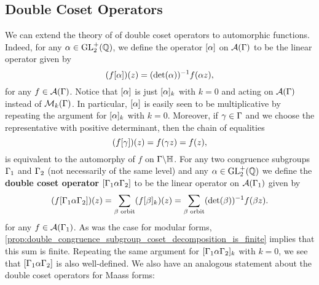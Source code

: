     \subsection*{Double Coset Operators}
      We can extend the theory of of double coset operators to automorphic functions. Indeed, for any $\alpha \in \mathrm{GL}_{2}^{+}(\mathbb{Q})$, we define the operator $[\alpha]$ on $\mathcal{A}(\Gamma)$ to be the linear operator given by
      \[
        (f[\alpha])(z) = (\det(\alpha))^{-1}f(\alpha z),
      \]
      for any $f \in \mathcal{A}(\Gamma)$. Notice that $[\alpha]$ is just $[\alpha]_{k}$ with $k = 0$ and acting on $\mathcal{A}(\Gamma)$ instead of $\mathcal{M}_{k}(\Gamma)$. In particular, $[\alpha]$ is easily seen to be multiplicative by repeating the argument for $[\alpha]_{k}$ with $k = 0$. Moreover, if $\gamma \in \Gamma$ and we choose the representative with positive determinant, then the chain of equalities
      \[
        (f[\gamma])(z) = f(\gamma z) = f(z),
      \]
      is equivalent to the automorphy of $f$ on $\Gamma\backslash\mathbb{H}$. For any two congruence subgroups $\Gamma_{1}$ and $\Gamma_{2}$ (not necessarily of the same level) and any $\alpha \in \mathrm{GL}_{2}^{+}(\mathbb{Q})$ we define the \textbf{double coset operator} $[\Gamma_{1}\alpha\Gamma_{2}]$ to be the linear operator on $\mathcal{A}(\Gamma_{1})$ given by
      \[
        (f[\Gamma_{1}\alpha\Gamma_{2}])(z) = \sum_{\beta \text{ orbit}}(f[\beta]_{k})(z) = \sum_{\beta \text{ orbit}}(\det(\beta))^{-1}f(\beta z).
      \]
      for any $f \in \mathcal{A}(\Gamma_{1})$. As was the case for modular forms, \cref{prop:double_congruence_subgroup_coset_decomposition_is_finite} implies that this sum is finite. Repeating the same argument for $[\Gamma_{1}\alpha\Gamma_{2}]_{k}$ with $k = 0$, we see that $[\Gamma_{1}\alpha\Gamma_{2}]$ is also well-defined.  We also have an analogous statement about the double coset operators for Maass forms:


